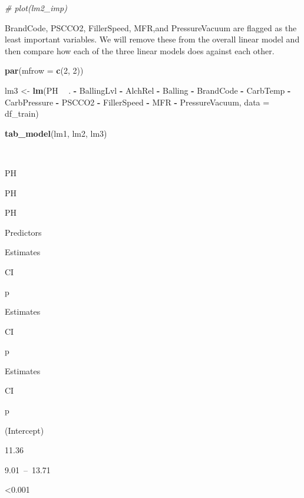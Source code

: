 \documentclass[]{report}
\newenvironment{Shaded}{\begin{snugshade}}{\end{snugshade}}
\newcommand{\CommentTok}[1]{\textcolor[rgb]{0.56,0.35,0.01}{\textit{#1}}}
\newcommand{\DataTypeTok}[1]{\textcolor[rgb]{0.13,0.29,0.53}{#1}}
\newcommand{\DecValTok}[1]{\textcolor[rgb]{0.00,0.00,0.81}{#1}}
\newcommand{\KeywordTok}[1]{\textcolor[rgb]{0.13,0.29,0.53}{\textbf{#1}}}
\newcommand{\NormalTok}[1]{#1}
\newcommand{\OperatorTok}[1]{\textcolor[rgb]{0.81,0.36,0.00}{\textbf{#1}}}
\newcommand{\StringTok}[1]{\textcolor[rgb]{0.31,0.60,0.02}{#1}}
\begin{document}
\begin{Shaded}
\begin{Highlighting}[]
\CommentTok{# plot(lm2_imp)}
\end{Highlighting}
\end{Shaded}

BrandCode, PSCCO2, FillerSpeed, MFR,and PressureVacuum are flagged as
the least important variables. We will remove these from the overall
linear model and then compare how each of the three linear models does
against each other.

\begin{Shaded}
\begin{Highlighting}[]
\KeywordTok{par}\NormalTok{(}\DataTypeTok{mfrow =} \KeywordTok{c}\NormalTok{(}\DecValTok{2}\NormalTok{, }\DecValTok{2}\NormalTok{))}

\NormalTok{lm3 <-}\StringTok{ }\KeywordTok{lm}\NormalTok{(PH }\OperatorTok{~}\StringTok{ }\NormalTok{. }\OperatorTok{-}\StringTok{ }\NormalTok{BallingLvl }\OperatorTok{-}\StringTok{ }\NormalTok{AlchRel }\OperatorTok{-}\StringTok{ }\NormalTok{Balling }\OperatorTok{-}\StringTok{ }\NormalTok{BrandCode }\OperatorTok{-}\StringTok{ }
\StringTok{    }\NormalTok{CarbTemp }\OperatorTok{-}\StringTok{ }\NormalTok{CarbPressure }\OperatorTok{-}\StringTok{ }\NormalTok{PSCCO2 }\OperatorTok{-}\StringTok{ }\NormalTok{FillerSpeed }\OperatorTok{-}\StringTok{ }\NormalTok{MFR }\OperatorTok{-}\StringTok{ }\NormalTok{PressureVacuum, }
    \DataTypeTok{data =}\NormalTok{ df_train)}

\KeywordTok{tab_model}\NormalTok{(lm1, lm2, lm3)}
\end{Highlighting}
\end{Shaded}

~

PH

PH

PH

Predictors

Estimates

CI

p

Estimates

CI

p

Estimates

CI

p

(Intercept)

11.36

9.01~--~13.71

\textless0.001
\end{document}
